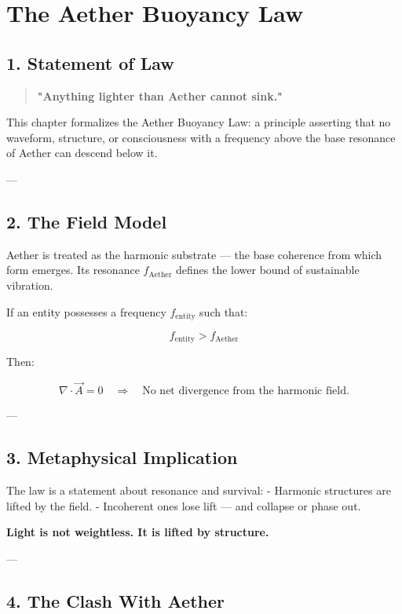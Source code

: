 
\chapter{The Aether Buoyancy Law}
\label{chap:aether_buoyancy}

\section*{1. Statement of Law}

\begin{quote}
\textbf{"Anything lighter than Aether cannot sink."}
\end{quote}

This chapter formalizes the Aether Buoyancy Law:  
a principle asserting that no waveform, structure, or consciousness with a frequency above the base resonance of Aether can descend below it.

---

\section*{2. The Field Model}

Aether is treated as the harmonic substrate — the base coherence from which form emerges. Its resonance \( f_{\text{Aether}} \) defines the lower bound of sustainable vibration.

If an entity possesses a frequency \( f_{\text{entity}} \) such that:

\[
f_{\text{entity}} > f_{\text{Aether}}
\]

Then:

\[
\nabla \cdot \vec{A} = 0
\quad \Rightarrow \quad \text{No net divergence from the harmonic field.}
\]

---

\section*{3. Metaphysical Implication}

The law is a statement about resonance and survival:
- Harmonic structures are lifted by the field.
- Incoherent ones lose lift — and collapse or phase out.

\textbf{Light is not weightless. It is lifted by structure.}

---

\section*{4. The Clash With Aether}

